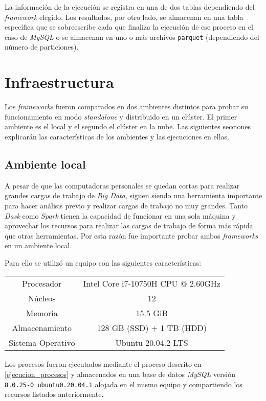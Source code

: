 La información de la ejecución se registra en una de dos tablas dependiendo del \textit{framework} elegido. Los resultados, por otro lado, se almacenan en una tabla específica que se sobreescribe cada que finaliza la ejecución de ese proceso en el caso de \textit{MySQL} o se almacenan en uno o más archivos \texttt{parquet} (dependiendo del número de particiones). 

\section{Infraestructura}

Los \textit{frameworks} fueron comparados en dos ambientes distintos para probar su funcionamiento en modo \textit{standalone} y distribuido en un clúster. El primer ambiente es el local y el segundo el clúster en la nube. Las siguientes secciones explicarán las características de los ambientes y las ejecuciones en ellas.

\subsection{Ambiente local}

A pesar de que las computadoras personales se quedan cortas para realizar grandes cargas de trabajo de \textit{Big Data}, siguen siendo una herramienta importante para hacer análisis previo y realizar cargas de trabajo no muy grandes. Tanto \textit{Dask} como \textit{Spark} tienen la capacidad de funcionar en una sola máquina y aprovechar los recursos para realizar las cargas de trabajo de forma más rápida que otras herramientas. Por esta razón fue importante probar ambos \textit{frameworks} en un ambiente local. 

Para ello se utilizó un equipo con las siguientes características:

\begin{center}
\begin{tabular}{|c|c|}
 \hline
  Procesador & Intel Core i7-10750H CPU @ 2.60GHz \\ 
  Núcleos & 12 \\
  Memoria & 15.5 GiB \\ 
  Almacenamiento & 128 GB (SSD) + 1 TB (HDD) \\ 
  Sistema Operativo & Ubuntu 20.04.2 LTS \\
  \hline
\end{tabular}
\end{center}

Los procesos fueron ejecutados mediante el proceso descrito en \ref{ejecucion_procesos} y almacenados en una base de datos \textit{MySQL} versión \texttt{8.0.25-0 ubuntu0.20.04.1} alojada en el mismo equipo y compartiendo los recursos listados anteriormente.

